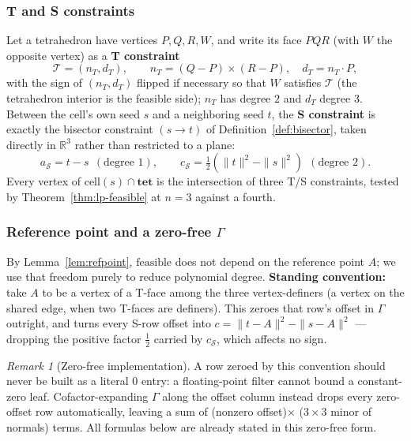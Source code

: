 \documentclass[12pt]{article}
\theoremstyle{definition}
\theoremstyle{remark}
\newtheorem{remark}[theorem]{Remark}
\begin{document}
\subsubsection*{T and S constraints}

Let a tetrahedron have vertices $P,Q,R,W$, and write its face $PQR$ (with
$W$ the opposite vertex) as a \textbf{T constraint}
\begin{equation*}
    \mathcal T = (n_T, d_T), \qquad n_T = (Q-P)\times(R-P), \quad d_T = n_T\cdot P,
\end{equation*}
with the sign of $(n_T,d_T)$ flipped if necessary so that $W$ satisfies
$\mathcal T$ (the tetrahedron interior is the feasible side); $n_T$ has
degree $2$ and $d_T$ degree $3$. Between the cell's own seed $s$ and a
neighboring seed $t$, the \textbf{S constraint} is exactly the bisector
constraint $(s\!\to\!t)$ of Definition~\ref{def:bisector}, taken directly in
$\mathbb{R}^3$ rather than restricted to a plane:
\begin{equation*}
    a_{\mathcal S} = t-s \ \ (\text{degree }1), \qquad c_{\mathcal S} = \tfrac12(\|t\|^2-\|s\|^2)\ \ (\text{degree }2).
\end{equation*}
Every vertex of $\mathrm{cell}(s)\cap\mathbf{tet}$ is the intersection of
three T/S constraints, tested by Theorem~\ref{thm:lp-feasible} at $n=3$
against a fourth.

\subsubsection*{Reference point and a zero-free $\Gamma$}

By Lemma~\ref{lem:refpoint}, $\mathrm{feasible}$ does not depend on the
reference point $A$; we use that freedom purely to reduce polynomial degree.
\textbf{Standing convention:} take $A$ to be a vertex of a T-face among the
three vertex-definers (a vertex on the shared edge, when two T-faces are
definers). This zeroes that row's offset in $\Gamma$ outright, and turns
every S-row offset into $c=\|t-A\|^2-\|s-A\|^2$ --- dropping the positive
factor $\tfrac12$ carried by $c_{\mathcal S}$, which affects no sign.

\begin{remark}[Zero-free implementation]\label{rem:zerofree}
A row zeroed by this convention should never be built as a literal $0$
entry: a floating-point filter cannot bound a constant-zero leaf.
Cofactor-expanding $\Gamma$ along the offset column instead drops every
zero-offset row automatically, leaving a sum of (nonzero offset)$\times$
($3\times3$ minor of normals) terms. All formulas below are already stated
in this zero-free form.
\end{remark}
\end{document}
